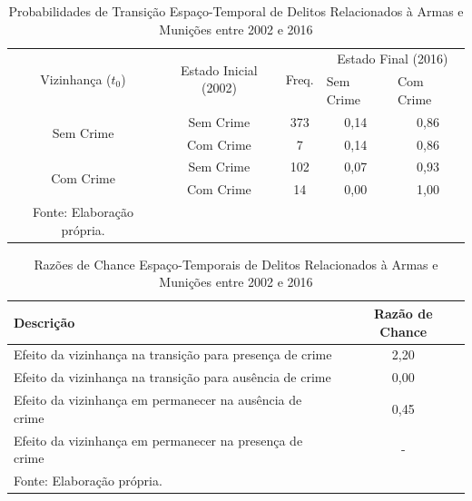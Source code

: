 \documentclass[12pt,openright,oneside,a4paper,english,french,spanish]{abntex2}
\numberwithin{table}{section} %
\numberwithin{figure}{section} %
\begin{document}
\begin{subappendices}
\begin{table}[H]
\centering
\caption{Probabilidades de Transição Espaço-Temporal de Delitos Relacionados à Armas e Munições entre 2002 e 2016}
        \begin{tabular}{ccccc}
            \hline
            \multirow{2}{*}{Vizinhança ($t_0$)} & \multirow{2}{*}{Estado Inicial (2002)} & \multirow{2}{*}{Freq.} & \multicolumn{2}{c}{Estado Final (2016)}  \\\cline{4-5} %
                                        & & & \multicolumn{1}{l}{Sem Crime} & \multicolumn{1}{l}{Com Crime} \\\hline
            \multirow{2}{*}{Sem Crime} & {Sem Crime} & 373 &  {0,14} & {0,86} \\
                                       & {Com Crime} & 7   &  {0,14} & {0,86} \\\hline
            \multirow{2}{*}{Com Crime} & {Sem Crime} & 102 &  {0,07} & {0,93} \\
                                       & {Com Crime} & 14  &  {0,00} & {1,00} \\\hline
            \tiny Fonte: Elaboração própria.
        \end{tabular}
    \label{tab:prob_espaco_tempo_rel_arma_2002_2016}
\end{table}


\begin{table}[H]
\centering
\caption{Razões de Chance Espaço-Temporais de Delitos Relacionados à Armas e Munições entre 2002 e 2016}
        \begin{tabular}{lc}
            \hline
            {\textbf{Descrição}} & {\textbf{Razão de Chance}} \\\hline
            {Efeito da vizinhança na transição para presença de crime} & {2,20} \\
            {Efeito da vizinhança na transição para ausência de crime} & {0,00} \\
            {Efeito da vizinhança em permanecer na ausência de crime} & {0,45} \\
            {Efeito da vizinhança em permanecer na presença de crime} & {-} \\\hline
            \tiny Fonte: Elaboração própria.
        \end{tabular}
    \label{tab:odds_espaco_tempo_rel_arma_2002_2016}
\end{table}











\end{subappendices}
\end{document}
